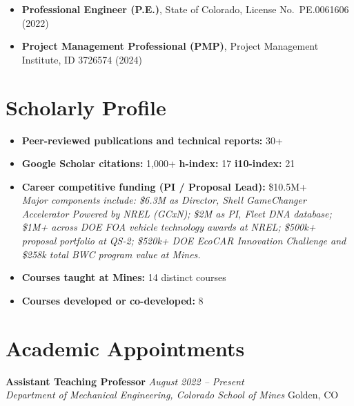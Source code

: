 \documentclass[11pt,letterpaper]{article}
\newcommand{\cventry}[4]{%
  \noindent\textbf{#1} \hfill \textit{#2}\\
  \textit{#3} \hfill #4\vspace{3pt}}
\begin{document}
\begin{itemize}
  \item \textbf{Professional Engineer (P.E.)}, State of Colorado, License No.\ PE.0061606 (2022)
  \item \textbf{Project Management Professional (PMP)}, Project Management Institute, ID 3726574 (2024)
\end{itemize}

\section{Scholarly Profile}

\begin{itemize}[noitemsep]
  \item \textbf{Peer-reviewed publications and technical reports:} 30+
  \item \textbf{Google Scholar citations:} 1,000+ \quad \textbf{h-index:} 17 \quad \textbf{i10-index:} 21
  \item \textbf{Career competitive funding (PI / Proposal Lead):} \$10.5M+\\
        {\small\textit{Major components include: \$6.3M as Director, Shell GameChanger Accelerator
        Powered by NREL (GCxN); \$2M as PI, Fleet DNA database; \$1M+ across DOE FOA vehicle technology
        awards at NREL; \$500k+ proposal portfolio at QS-2; \$520k+ DOE EcoCAR Innovation Challenge
        and \$258k total BWC program value at Mines.}}
  \item \textbf{Courses taught at Mines:} 14 distinct courses
  \item \textbf{Courses developed or co-developed:} 8
\end{itemize}

\section{Academic Appointments}

\cventry{Assistant Teaching Professor}{August 2022 -- Present}
  {Department of Mechanical Engineering, Colorado School of Mines}{Golden, CO}
\end{document}
